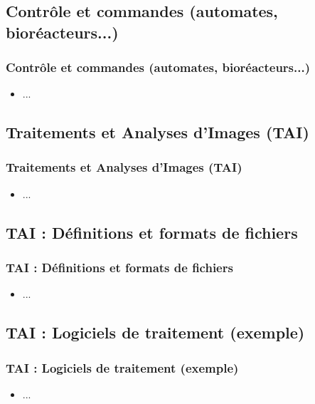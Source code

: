 \documentclass{beamer}
\begin{document}
\section{  }
\begin{frame}
	\frametitle{  }
	\tableofcontents[sections=3,currentsection,subsectionstyle=show/shaded/hide]
\end{frame} 

\def\titleSection3SubsectionI{Contr{\^o}le et commandes (automates, bior{\'e}acteurs...)}
\subsection{ \titleSection3SubsectionI }
\begin{frame}
	\frametitle{ \titleSection3SubsectionI }
	\begin{itemize}
		\item ... 
	\end{itemize}
\end{frame}

\def\titleSection3Subsection2ACRO{TAI}
\def\titleSection3Subsection2{Traitements et Analyses d'Images (TAI)}
\subsection{ \titleSection3Subsection2 }
\begin{frame}
	\frametitle{ \titleSection3Subsection2 }
	\begin{itemize}
		\item ... 
	\end{itemize}
\end{frame}


\def\titleSection3Subsection2to1{ TAI : D{\'e}finitions et formats de fichiers}
\subsection{ \titleSection3Subsection2to1 }
\begin{frame}
	\frametitle{ \titleSection3Subsection2to1 }
	\begin{itemize}
		\item ... 
	\end{itemize}
\end{frame}

\def\titleSection3Subsection2subsubsection2{ TAI : Logiciels de traitement (exemple)}
\subsection{ \titleSection3Subsection2subsubsection2 }
\begin{frame}
	\frametitle{ \titleSection3Subsection2subsubsection2 }
	\begin{itemize}
		\item ... 
	\end{itemize}
\end{frame}
\end{document}

